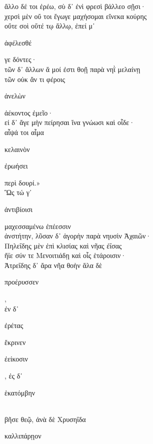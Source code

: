 \documentclass{ransom}
\begin{document}
\renewcommand{\rightheaderwhat}{\rightheaderwhatglosses}%
\begin{foreignpage}
\begin{graytext}
ἄλλο δέ τοι ἐρέω, σὺ δ᾽ ἐνὶ φρεσὶ βάλλεο σῇσι·\\
χερσὶ μὲν οὔ τοι ἔγωγε μαχήσομαι εἵνεκα κούρης\\
οὔτε σοὶ οὔτέ τῳ ἄλλῳ, ἐπεί μ᾽ \begin{whitetext}ἀφέλεσθέ\end{whitetext} γε δόντες·\\
τῶν δ᾽ ἄλλων ἅ μοί ἐστι θοῇ παρὰ νηῒ μελαίνῃ\hfill{}\\
τῶν οὐκ ἄν τι φέροις \begin{whitetext}ἀνελὼν\end{whitetext} ἀέκοντος ἐμεῖο·\\
εἰ δ᾽ ἄγε μὴν πείρησαι ἵνα γνώωσι καὶ οἷδε·\\
αἶψά τοι αἷμα \begin{whitetext}κελαινὸν\end{whitetext} \begin{whitetext}ἐρωήσει\end{whitetext} περὶ δουρί.»\\
Ὣς τώ γ᾽ \begin{whitetext}ἀντιβίοισι\end{whitetext} μαχεσσαμένω ἐπέεσσιν\\
ἀνστήτην, λῦσαν δ᾽ ἀγορὴν παρὰ νηυσὶν Ἀχαιῶν·\hfill{}\\
Πηλεΐδης μὲν ἐπὶ κλισίας καὶ νῆας ἐΐσας\\
ἤϊε σύν τε Μενοιτιάδῃ καὶ οἷς ἑτάροισιν·\\
Ἀτρεΐδης δ᾽ ἄρα νῆα θοὴν ἅλα δὲ \begin{whitetext}προέρυσσεν\end{whitetext},\\
ἐν δ᾽ \begin{whitetext}ἐρέτας\end{whitetext} \begin{whitetext}ἔκρινεν\end{whitetext} \begin{whitetext}ἐείκοσιν\end{whitetext}, ἐς δ᾽ \begin{whitetext}ἑκατόμβην\end{whitetext}\\
βῆσε θεῷ, ἀνὰ δὲ Χρυσηΐδα \begin{whitetext}καλλιπάρῃον\end{whitetext}\hfill{}\\

\end{graytext}
\end{foreignpage}
\end{document}
